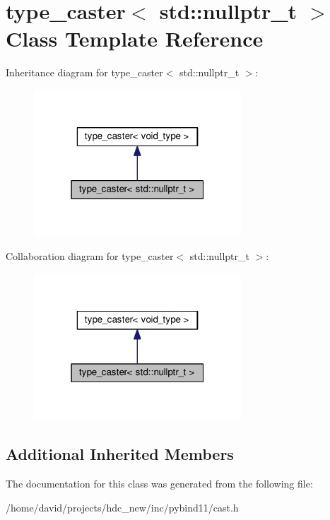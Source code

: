 \hypertarget{classtype__caster_3_01std_1_1nullptr__t_01_4}{}\section{type\+\_\+caster$<$ std\+:\+:nullptr\+\_\+t $>$ Class Template Reference}
\label{classtype__caster_3_01std_1_1nullptr__t_01_4}


Inheritance diagram for type\+\_\+caster$<$ std\+:\+:nullptr\+\_\+t $>$\+:
\nopagebreak
\begin{figure}[H]
\begin{center}
\leavevmode
\includegraphics[width=220pt]{classtype__caster_3_01std_1_1nullptr__t_01_4__inherit__graph}
\end{center}
\end{figure}


Collaboration diagram for type\+\_\+caster$<$ std\+:\+:nullptr\+\_\+t $>$\+:
\nopagebreak
\begin{figure}[H]
\begin{center}
\leavevmode
\includegraphics[width=220pt]{classtype__caster_3_01std_1_1nullptr__t_01_4__coll__graph}
\end{center}
\end{figure}
\subsection*{Additional Inherited Members}


The documentation for this class was generated from the following file\+:\begin{DoxyCompactItemize}
\item 
/home/david/projects/hdc\+\_\+new/inc/pybind11/cast.\+h\end{DoxyCompactItemize}
